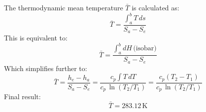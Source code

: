 The thermodynamic mean temperature \( \bar{T} \) is calculated as:  
\[ \bar{T} = \frac{\int_a^b T \, ds}{S_a - S_e} \]  
This is equivalent to:  
\[ \bar{T} = \frac{\int_a^b dH \, \text{(isobar)}}{S_a - S_e} \]  
Which simplifies further to:  
\[ \bar{T} = \frac{h_e - h_a}{S_a - S_e} = \frac{c_p \int T \, dT}{c_p \, \ln(T_2 / T_1)} = \frac{c_p (T_2 - T_1)}{c_p \, \ln(T_2 / T_1)} \]  
Final result:  
\[ \bar{T} = 283.12 \, \text{K} \]